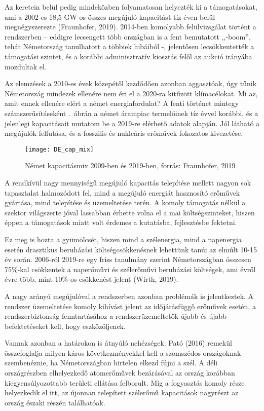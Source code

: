 \documentclass[twoside, magyar, showtrims]{corvinusphd}
\theoremstyle{plain}
\theoremstyle{remark}
\theoremstyle{definition}
\begin{document}
Az  keretein belül pedig
mindeközben folyamatosan helyezték ki a támogatásokat,
ami a 2002-es 18,5 GW-os összes megújuló
kapacitást tíz éven belül megnégyszerezte
(Fraunhofer, 2019).
2014-ben komolyabb felülvizsgálat történt a rendszerben -- 
eddigre lecsengett több országban is a
fent bemutatott ,,-boom'', tehát Németország
tanulhatott a többiek hibáiból -,
jelentősen lecsökkentették a támogatási szintet,
és a korábbi adminisztratív kiosztás felől 
az aukció irányába mozdultak el.

Az elemzések a 2010-es évek közepétől
kezdődően azonban aggasztóak, úgy tűnik
Németország mindezek ellenére nem éri el
a 2020-ra kitűzött klímacélokat. 
Mi az, amit ennek ellenére elért a német energiafordulat? 
A fenti történet mintegy számszerűsításeként .~ábrán
a német árampiac termelőinek tíz évvel korábbi,
és a jelenlegi kapacitásait mutatom be a
2019-re elérhető adatok alapján. Jól látható a megújulók
felfutása, és a fosszilis és nukleáris erőművek fokozatos kivezetése.

\begin{figure}
    \centering
    \texttt{[image: DE\_cap\_mix]}
    \caption{Német kapacitásmix 2009-ben és 2019-ben, forrás: Fraunhofer, 2019}
    \label{fig:DE_cap_mix}
\end{figure}

A rendkívül nagy mennyiségű megújuló
kapacitás telepítése mellett nagyon sok tapasztalat
halmozódott fel, mind a megújuló energiát hasznosító
erőművek gyártása, mind telepítése és üzemeltetése
terén. A komoly támogatás nélkül a szektor
világszerte jóval lassabban érhette volna el a mai költségszinteket,
hiszen éppen a támogatások miatt
volt érdemes a kutatásba, fejlesztésbe fektetni.

Ez meg is hozta a gyümölcsét, hiszen mind a szélenergia,
mind a napenergia esetén drasztikus
beruházási költségcsökkenésnek
lehettünk tanúi az elmúlt 10-15 év során.
2006-ról 2019-re egy friss tanulmány
szerint Németországban összesen 75\%-kal
csökkentek a naperőművi és szélerőművi 
beruházási költségek, ami évről évre több,
mint 10\%-os csökkenést jelent (Wirth, 2019).
\label{invcsokken}

A nagy arányú megújulóval a rendszerben
azonban problémák is jelentkeztek.
A rendszer üzemeltetése komoly kihívást
jelent az időjárásfüggő erőművek esetén,
a rendszerbiztonság fenntartásához a rendszerüzemeltetők
újabb és újabb befektetéseket
kell, hogy eszközöljenek.

Vannak azonban a határokon is átnyúló nehézségek:
Pató (2016) remekül összefoglalja
milyen káros következményekkel kell
a szomszédos országoknak szembenéznie,
ha Németországban hirtelen elkezd fújni a szél. 
A déli országrészben elhelyezkedő atomerőművek
bezárásával az ország korábban kiegyensúlyozottabb
területi ellátása felborult. Míg a fogyasztás komoly
része helyezkedik el itt, az újonnan telepített
szélerőmű kapacitások nagyrészt 
az ország északi részén találhatóak.
\end{document}

